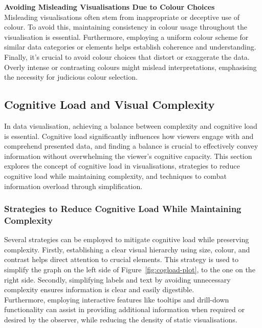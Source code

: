 \documentclass{article}\usepackage[]{graphicx}\usepackage[]{xcolor}
\numberwithin{equation}{section}
\begin{document}
\noindent \textbf{Avoiding Misleading Visualisations Due to Colour Choices}\\
Misleading visualisations often stem from inappropriate or deceptive use of colour. To avoid this, maintaining consistency in colour usage throughout the visualisation is essential. Furthermore, employing a uniform colour scheme for similar data categories or elements helps establish coherence and understanding. Finally, it's crucial to avoid colour choices that distort or exaggerate the data. Overly intense or contrasting colours might mislead interpretations, emphasising the necessity for judicious colour selection.

\subsection{Cognitive Load and Visual Complexity}
In data visualisation, achieving a balance between complexity and cognitive load is essential. Cognitive load significantly influences how viewers engage with and comprehend presented data, and finding a balance is crucial to effectively convey information without overwhelming the viewer's cognitive capacity. This section explores the concept of cognitive load in visualisations, strategies to reduce cognitive load while maintaining complexity, and techniques to combat information overload through simplification.

\subsubsection{Strategies to Reduce Cognitive Load While Maintaining Complexity}
Several strategies can be employed to mitigate cognitive load while preserving complexity. Firstly, establishing a clear visual hierarchy using size, colour, and contrast helps direct attention to crucial elements. This strategy is used to simplify the graph on the left side of Figure~\ref{fig:cogload-plot}, to the one on the right side. Secondly, simplifying labels and text by avoiding unnecessary complexity ensures information is clear and easily digestible.\\

\noindent Furthermore, employing interactive features like tooltips and drill-down functionality can assist in providing additional information when required or desired by the observer, while reducing the density of static visualisations.\\
\end{document}
